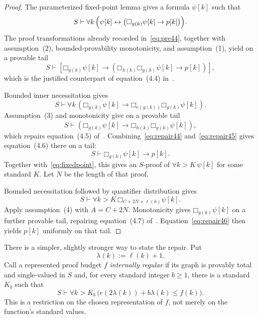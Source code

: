 \documentclass[11pt]{article}
\theoremstyle{definition}
\theoremstyle{remark}
\newcommand{\elln}{\ell}
\newcommand{\Boxb}[1]{\mathord{\Box}_{#1}}
\begin{document}
\begin{proof}
The parameterized fixed-point lemma gives a formula $\psi[k]$ such that
\begin{equation}\label{eq:fixedpoint}
  S\vdash\forall k\,
  \Bigl(\psi[k]\leftrightarrow
  \bigl(\Boxb{g(k)}\psi[k]\to p[k]\bigr)\Bigr).
\end{equation}
The proof transformations already recorded in~\eqref{eq:pre44}, together with assumption~(2), bounded-provability monotonicity, and assumption~(1), yield on a provable tail
\begin{equation}\label{eq:repair44}
S\vdash
\left[
\Boxb{g(k)}\psi[k]
\to
\left(
\Boxb{h(k)}\Boxb{g(k)}\psi[k]
\to p[k]
\right)
\right],
\end{equation}
which is the justified counterpart of equation~(4.4) in~\cite{Critch}.

Bounded inner necessitation gives
\[
S\vdash\forall k\,
\left(
\Boxb{g(k)}\psi[k]
\to
\Boxb{e(g(k))}\Boxb{g(k)}\psi[k]
\right).
\]
Assumption~(3) and monotonicity give on a provable tail
\begin{equation}\label{eq:repair45}
S\vdash
\left(
\Boxb{g(k)}\psi[k]
\to
\Boxb{h(k)}\Boxb{g(k)}\psi[k]
\right),
\end{equation}
which repairs equation~(4.5) of~\cite{Critch}.  Combining~\eqref{eq:repair44} and~\eqref{eq:repair45} gives equation~(4.6) there on a tail:
\begin{equation}\label{eq:repair46}
  S\vdash \Boxb{g(k)}\psi[k]\to p[k].
\end{equation}
Together with~\eqref{eq:fixedpoint}, this gives an $S$-proof of $\forall k>K\,\psi[k]$ for some standard $K$.  Let $N$ be the length of that proof.

Bounded necessitation followed by quantifier distribution gives
\[
  S\vdash\forall k>K\,
  \Boxb{C+2N+\elln(k)}\psi[k].
\]
Apply assumption~(4) with $A=C+2N$.  Monotonicity gives $\Boxb{g(k)}\psi[k]$ on a further provable tail, repairing equation~(4.7) of~\cite{Critch}.  Equation~\eqref{eq:repair46} then yields $p[k]$ uniformly on that tail.
\end{proof}

There is a simpler, slightly stronger way to state the repair.  Put
\[
  \lambda(k):=\elln(k)+1.
\]
Call a represented proof budget $f$ \emph{internally regular} if its graph is provably total and single-valued in $S$ and, for every standard integer $b\geq 1$, there is a standard $K_b$ such that
\begin{equation}\label{eq:regularbudget}
  S\vdash\forall k>K_b\,
  \bigl(e(2\lambda(k))+b\lambda(k)\leq f(k)\bigr).
\end{equation}
This is a restriction on the chosen representation of $f$, not merely on the function's standard values.
\end{document}
